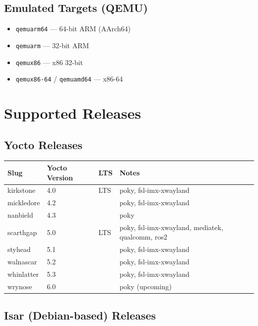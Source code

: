 \documentclass[a4paper,11pt]{article}
\begin{document}
\subsection{Emulated Targets (QEMU)}

\begin{itemize}
  \item \texttt{qemuarm64} --- 64-bit ARM (AArch64)
  \item \texttt{qemuarm}   --- 32-bit ARM
  \item \texttt{qemux86}   --- x86 32-bit
  \item \texttt{qemux86-64} / \texttt{qemuamd64} --- x86-64
\end{itemize}

\section{Supported Releases}

\subsection{Yocto Releases}

\begin{tabularx}{\linewidth}{L{28mm}L{24mm}L{12mm}X}
  \textbf{Slug} & \textbf{Yocto Version} & \textbf{LTS} & \textbf{Notes} \\
  \toprule
   kirkstone  & 4.0 & LTS & poky, fsl-imx-xwayland \\
    mickledore & 4.2 &     & poky, fsl-imx-xwayland \\
   nanbield   & 4.3 &     & poky \\
    scarthgap  & 5.0 & LTS & poky, fsl-imx-xwayland, mediatek, qualcomm, ros2 \\
   styhead    & 5.1 &     & poky, fsl-imx-xwayland \\
    walnascar  & 5.2 &     & poky, fsl-imx-xwayland \\
   whinlatter & 5.3 &     & poky, fsl-imx-xwayland \\
    wrynose    & 6.0 &     & poky (upcoming) \\
  \bottomrule
\end{tabularx}

\subsection{Isar (Debian-based) Releases}
\end{document}

